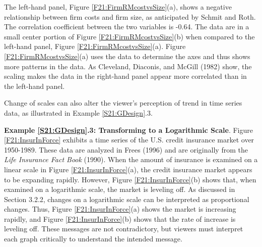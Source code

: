 The left-hand panel, Figure \ref{F21:FirmRMcostvsSize}(a), shows a
negative relationship between firm costs and firm size, as
anticipated by Schmit and Roth. The correlation coefficient between
the two variables is -0.64. The data are in a small center portion
of Figure \ref{F21:FirmRMcostvsSize}(b) when compared to the
left-hand panel, Figure \ref{F21:FirmRMcostvsSize}(a). Figure
\ref{F21:FirmRMcostvsSize}(a) uses the data to determine the axes
and thus shows more patterns in the data. As Cleveland, Diaconis,
and McGill (1982) show, the scaling makes the data in the right-hand
panel appear more correlated than in the left-hand panel.

Change of scales can also alter the viewer's perception of trend in
time series data, as illustrated in Example \ref{S21:GDesign}.3.

\linejed

\textbf{Example \ref{S21:GDesign}.3: Transforming to a Logarithmic
Scale}. Figure \ref{F21:InsurInForce} exhibits a time series of the
U.S. credit insurance market over 1950-1989. These data are analyzed
in Frees (1996) and are originally from the \emph{Life Insurance
Fact Book} (1990). When the amount of insurance is examined on a
linear scale in Figure \ref{F21:InsurInForce}(a), the credit
insurance market appears to be expanding rapidly. However, Figure
\ref{F21:InsurInForce}(b) shows that, when examined on a logarithmic
scale, the market is leveling off. As discussed in Section 3.2.2,
changes on a logarithmic scale can be interpreted as proportional
changes. Thus, Figure \ref{F21:InsurInForce}(a) shows the market is
increasing rapidly, and Figure \ref{F21:InsurInForce}(b) shows that
the rate of increase is leveling off. These messages are not
contradictory, but viewers must interpret each graph critically to
understand the intended message.

